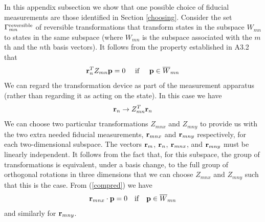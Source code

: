 \documentclass[10pt,twocolumn]{article}
\begin{document}
\vspace{4mm}


\vspace{4mm}

In this appendix subsection we show that one possible choice of fiducial
measurements are those identified in Section \ref{choosing}.
Consider the set $\Gamma_{mn}^{\rm reversible}$ of reversible
transformations that transform states in the subspace $W_{mn}$ to states
in the same subspace (where $W_{mn}$ is the subspace associated with the
$m$th and the $n$th basis vectors).
It follows from the property established in A3.2 that
\begin{equation}\label{compred}
{\bf r}^T_n Z_{mn} {\bf p} = 0 ~~~~{\rm if}~~~~ {\bf p}\in
\overline{W}_{mn}
\end{equation}
We can regard the transformation device as part of the measurement
apparatus (rather than regarding it as acting on the state).  In this
case we have
\begin{equation}
{\bf r}_n\rightarrow Z^T_{mn} {\bf r}_n
\end{equation}
We can choose two particular transformations $Z_{mnx}$ and $Z_{mny}$ to
provide us with the two extra needed fiducial measurements, ${\bf
r}_{mnx}$ and ${\bf r}_{mny}$ respectively,  for each two-dimensional
subspace.  The vectors ${\bf r}_m$, ${\bf r}_n$, ${\bf r}_{mnx}$, and
${\bf r}_{mny}$ must be linearly independent.  It follows from the
fact that, for this subspace, the group of transformations is
equivalent, under a basis change, to the full group of orthogonal rotations
in three dimensions that we
can choose $Z_{mnx}$ and $Z_{mny}$ such that this is the case.
From (\ref{compred}) we have
\begin{equation}\label{useful}
{\bf r}_{mnx} \cdot {\bf p} = 0 ~~~{\rm if}~~~ {\bf p}\in \overline{W}_{mn}
\end{equation}
and similarly for ${\bf r}_{mny}$.
\end{document}
